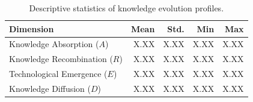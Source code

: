 
\begin{table}[t]
\centering
\caption{Descriptive statistics of knowledge evolution profiles.}
\begin{tabular}{lrrrr}
\toprule
Dimension & Mean & Std. & Min & Max\\
\midrule
Knowledge Absorption ($A$) & X.XX & X.XX & X.XX & X.XX\\
Knowledge Recombination ($R$) & X.XX & X.XX & X.XX & X.XX\\
Technological Emergence ($E$) & X.XX & X.XX & X.XX & X.XX\\
Knowledge Diffusion ($D$) & X.XX & X.XX & X.XX & X.XX\\
\bottomrule
\end{tabular}
\label{tab:evolution_stats}
\end{table}
